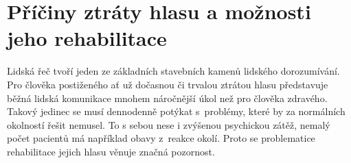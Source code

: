 \ifdefined\CELE
\else

\fi

\chapter{Příčiny ztráty hlasu a možnosti jeho rehabilitace}
\label{chap:cause}

Lidská řeč tvoří jeden ze základních stavebních kamenů lidského dorozumívání. Pro člověka
postiženého ať už dočasnou či trvalou ztrátou hlasu představuje běžná lidská
komunikace mnohem náročnější úkol než pro člověka zdravého. Takový jedinec se
musí dennodenně potýkat s~problémy, které by za normálních okolností řešit
nemusel. To s sebou nese %
i zvýšenou psychickou zátěž, nemalý počet pacientů má například obavy %
z~reakce okolí. Proto se problematice rehabilitace jejich
hlasu věnuje značná pozornost.



% 
% 

\ifdefined\CELE
\else

\fi
